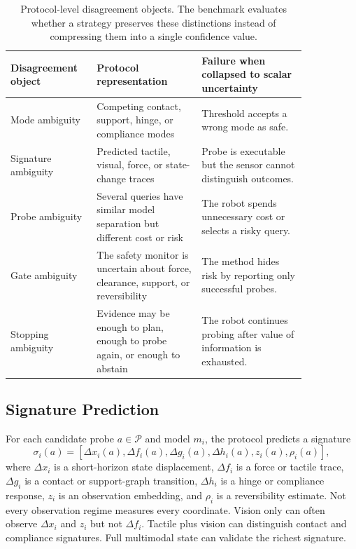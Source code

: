 \documentclass{article}
\begin{document}
\begin{table}[t]
\centering
\small
\begin{tabular}{p{0.22\linewidth}p{0.31\linewidth}p{0.31\linewidth}}
\toprule
Disagreement object & Protocol representation & Failure when collapsed to scalar uncertainty \\
\midrule
Mode ambiguity & Competing contact, support, hinge, or compliance modes & Threshold accepts a wrong mode as safe. \\
Signature ambiguity & Predicted tactile, visual, force, or state-change traces & Probe is executable but the sensor cannot distinguish outcomes. \\
Probe ambiguity & Several queries have similar model separation but different cost or risk & The robot spends unnecessary cost or selects a risky query. \\
Gate ambiguity & The safety monitor is uncertain about force, clearance, support, or reversibility & The method hides risk by reporting only successful probes. \\
Stopping ambiguity & Evidence may be enough to plan, enough to probe again, or enough to abstain & The robot continues probing after value of information is exhausted. \\
\bottomrule
\end{tabular}
\caption{Protocol-level disagreement objects. The benchmark evaluates whether a strategy preserves these distinctions instead of compressing them into a single confidence value.}
\label{tab:disagreement_objects}
\end{table}

\subsection{Signature Prediction}

For each candidate probe $a \in \mathcal{P}$ and model $m_i$, the protocol predicts a signature
\[
    \sigma_i(a) =
    \left[
    \Delta x_i(a),
    \Delta f_i(a),
    \Delta g_i(a),
    \Delta h_i(a),
    z_i(a),
    \rho_i(a)
    \right],
\]
where $\Delta x_i$ is a short-horizon state displacement, $\Delta f_i$ is a force or tactile trace, $\Delta g_i$ is a contact or support-graph transition, $\Delta h_i$ is a hinge or compliance response, $z_i$ is an observation embedding, and $\rho_i$ is a reversibility estimate. Not every observation regime measures every coordinate. Vision only can often observe $\Delta x_i$ and $z_i$ but not $\Delta f_i$. Tactile plus vision can distinguish contact and compliance signatures. Full multimodal state can validate the richest signature.
\end{document}
